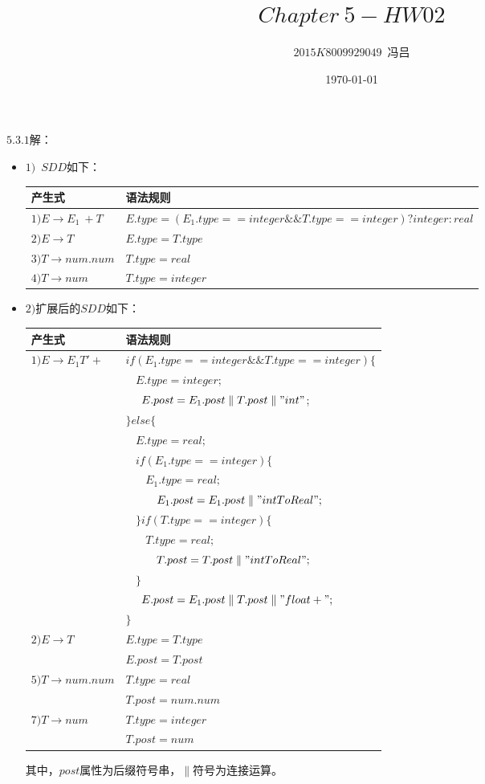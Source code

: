 \documentclass[UTF8,noindent]{ctexart}
\title{$Chapter\ 5-HW02$}
\author{$2015K8009929049$\ 冯吕}
\date{\today}
\begin{document}
\maketitle
{}
$5.3.1$解：
\begin{itemize}
  \item $1)$\ $SDD$如下：\\
\begin{center}
	\begin{tabular}{|l|l|}
	  \hline
	   产生式& 语法规则\\
	  \hline
	$1)E\rightarrow E_1\ + T$ & $E.type= (E_1.type ==  integer \&\& T.type == integer)?integer:real$\\
	\hline
  $2)E\rightarrow T$ & $E.type = T.type$\\
  \hline 
$3)T\rightarrow num.num$ & $T.type = real$\\
\hline 
$4)T\rightarrow num$ & $T.type = integer$\\
\hline
	\end{tabular}
  \end{center}
\item $2)$扩展后的$SDD$如下：
\begin{center}
  \begin{tabular}{|l|l|}
	\hline
	 产生式 & 语法规则\\
	\hline
  $1)E \rightarrow E_1 T' +$ & $if (E_1.type ==  integer \&\& T.type == integer) \{ $\\
	& $\ \ \ \ E.type = integer;$\\
	& $\ \ \ \ E.post = E_1.post \parallel T.post\parallel "int"$;\\
  & $\}else\{$\\
	& $\ \ \ \ E.type = real;$\\
	& $\ \ \ \ if (E_1.type= = integer )\{$\\
	  & $\ \ \ \ \ \ \ \ E_1.type = real;$ \\
	  & $ \ \ \ \ \ \ \ \ E_1.post = E_1.post \parallel "intToReal";$\\
	& $\ \ \ \ \}if (T.type= = integer )\{$\\
	  & $\ \ \ \ \ \ \ \ T.type = real;$ \\
	  & $ \ \ \ \ \ \ \ \ T.post = T.post \parallel "intToReal";$\\
	& $\ \ \ \ \}$\\
	  & $\ \ \ \ E.post = E_1.post\parallel T.post \parallel "float+";$\\
  & $\}$\\
  \hline 
$2)E\rightarrow T$ & $E.type = T.type$\\
& $ E.post = T.post$\\
\hline
$5)T\rightarrow num.num $ & $T.type = real$\\
& $T.post = num.num$\\
\hline
$7)T\rightarrow num$ & $T.type = integer$\\
& $T.post = num$\\
\hline
  \end{tabular}
\end{center}
其中，$post$属性为后缀符号串，$\parallel$符号为连接运算。
\end{itemize}
\end{document}
